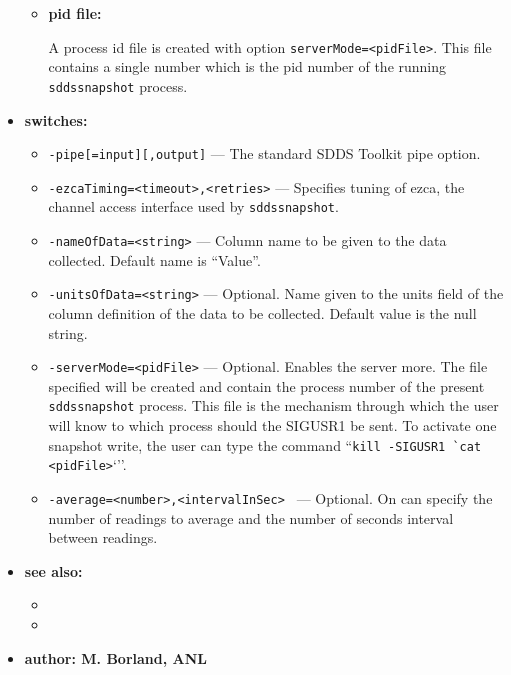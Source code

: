 \begin{itemize}
\begin{itemize}
\item {\bf pid file:}\par
A process id file is created with option {\verb+serverMode=<pidFile>+}. This file contains a single
number which is the pid number of the running {\verb+sddssnapshot+} process.
\end{itemize}
%
\item {\bf switches:}
%
%
    \begin{itemize}
%
%
        \item {\tt -pipe[=input][,output]} --- The standard SDDS Toolkit pipe option.
        \item {\tt -ezcaTiming=<timeout>,<retries>} --- Specifies tuning of ezca, the channel access 
        interface used by \verb+sddssnapshot+.
        \item {\tt -nameOfData=<string>} --- Column name to be given to the data collected. Default name is ``Value''.
        \item {\tt -unitsOfData=<string>} --- Optional. Name given to the units field of the column definition 
                        of the data to be collected. Default value is the null string.
        \item {\tt -serverMode=<pidFile>} --- Optional. Enables the server more. The file specified will be created and contain
                the process number of the present \verb+sddssnapshot+ process. This file is the mechanism
                through which the user will know to which process should the SIGUSR1 be sent.
                To activate one snapshot write, the user can type
                the command ``\verb+kill -SIGUSR1 `cat <pidFile>+`''.
        \item {\tt -average=<number>,<intervalInSec> } --- Optional. On can specify the number of readings to
                average and the number of seconds interval between readings.
    \end{itemize}

\item {\bf see also:}
    \begin{itemize}
%
%
    \item {}
    \item {}
    \end{itemize}
%
%
\item {\bf author: M. Borland, ANL} 
\end{itemize}
